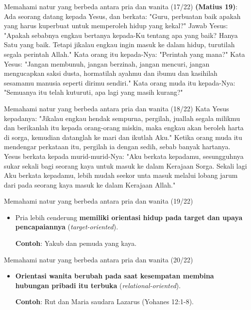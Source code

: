 \documentclass{beamer}
\theoremstyle{mystyle}
\let\emph\relax %
\begin{document}
\begin{frame}{Memahami natur yang berbeda antara pria dan wanita (17/22)}
\emph{Pemuda yang kaya} \textbf{(Matius 19)}: Ada seorang datang kepada Yesus, dan berkata: "Guru, perbuatan baik apakah yang harus kuperbuat untuk memperoleh hidup yang kekal?" Jawab Yesus: "Apakah sebabnya engkau bertanya kepada-Ku tentang apa yang baik? Hanya Satu yang baik. Tetapi jikalau engkau ingin masuk ke dalam hidup, turutilah segala perintah Allah." Kata orang itu kepada-Nya: "Perintah yang mana?" Kata Yesus: "Jangan membunuh, jangan berzinah, jangan mencuri, jangan mengucapkan saksi dusta, hormatilah ayahmu dan ibumu dan kasihilah sesamamu manusia seperti dirimu sendiri." Kata orang muda itu kepada-Nya: "Semuanya itu telah kuturuti, apa lagi yang masih kurang?" 	
\end{frame}

\begin{frame}{Memahami natur yang berbeda antara pria dan wanita (18/22)}
	Kata Yesus kepadanya: "Jikalau engkau hendak sempurna, pergilah, juallah segala milikmu dan berikanlah itu kepada orang-orang miskin, maka engkau akan beroleh harta di sorga, kemudian datanglah ke mari dan ikutlah Aku." Ketika orang muda itu mendengar perkataan itu, pergilah ia dengan sedih, sebab banyak hartanya. Yesus berkata kepada murid-murid-Nya: "Aku berkata kepadamu, sesungguhnya sukar sekali bagi seorang kaya untuk masuk ke dalam Kerajaan Sorga. Sekali lagi Aku berkata kepadamu, lebih mudah seekor unta masuk melalui lobang jarum dari pada seorang kaya masuk ke dalam Kerajaan Allah."
\end{frame}

\begin{frame}{Memahami natur yang berbeda antara pria dan wanita (19/22)}

	\begin{itemize}
		\item Pria lebih cenderung \textbf{memiliki orientasi hidup pada target dan upaya pencapaiannya} (\textit{target-oriented}).
		
		\bigskip
		
		\textbf{Contoh}: Yakub dan pemuda yang kaya.
						
	\end{itemize}	
\end{frame}

\begin{frame}{Memahami natur yang berbeda antara pria dan wanita (20/22)}
	\begin{itemize}
		\item \textbf{Orientasi wanita berubah pada saat kesempatan membina hubungan pribadi itu terbuka} (\textit{relational-oriented}).
		
		\bigskip		
		
		\textbf{Contoh}: Rut dan Maria saudara Lazarus (Yohanes 12:1-8).		
	\end{itemize}
\end{frame}
\end{document}
